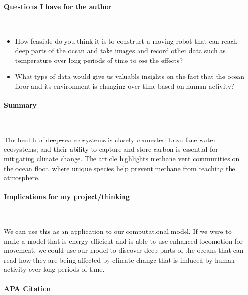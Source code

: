 \vspace*{-0.5cm}
\paragraph{Questions I have for the author} \ 

\begin{itemize}
    \item How feasible do you think it is to construct a moving robot that can reach deep parts of the ocean and take images and record other data such as temperature over long periods of time to see the effects?
    \item What type of data would give us valuable insights on the fact that the ocean floor and its environment is changing over time based on human activity?
\end{itemize}

\vspace*{-0.5cm}
\paragraph{Summary} \

The health of deep-sea ecosystems is closely connected to surface water ecosystems, and their ability to capture and store carbon is essential for mitigating climate change. The article highlights methane vent communities on the ocean floor, where unique species help prevent methane from reaching the atmosphere. 

\vspace*{-0.5cm}
\paragraph{Implications for my project/thinking} \

We can use this as an application to our computational model. If we were to make a model that is energy efficient and is able to use enhanced locomotion for movement, we could use our model to discover deep parts of the oceans that can read how they are being affected by climate change that is induced by human activity over long periods of time. 

\newpage

\vspace*{-0.5cm}
\paragraph{APA Citation} \

